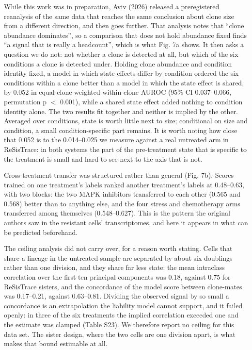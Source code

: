\documentclass[11pt,a4paper]{article}
\begin{document}
While this work was in preparation, Aviv (2026) released a preregistered reanalysis of the same data that reaches the same conclusion about clone size from a different direction, and then goes further. That analysis notes that ``clone abundance dominates'', so a comparison that does not hold abundance fixed finds ``a signal that is really a headcount'', which is what Fig. 7a shows. It then asks a question we do not: not whether a clone is detected at all, but which of the six conditions a clone is detected under. Holding clone abundance and condition identity fixed, a model in which state effects differ by condition ordered the six conditions within a clone better than a model in which the state effect is shared, by 0.052 in equal-clone-weighted within-clone AUROC (95\% CI 0.037--0.066, permutation p $<$ 0.001), while a shared state effect added nothing to condition identity alone. The two results fit together and neither is implied by the other. Averaged over conditions, state is worth little next to size; conditional on size and condition, a small condition-specific part remains. It is worth noting how close that 0.052 is to the 0.014--0.025 we measure against a real untreated arm in ReSisTrace: in both systems the part of the pre-treatment state that is specific to the treatment is small and hard to see next to the axis that is not.

Cross-treatment transfer was structured rather than general (Fig. 7b). Scores trained on one treatment's labels ranked another treatment's labels at 0.48--0.63, with two blocks: the two MAPK inhibitors transferred to each other (0.565 and 0.568) better than to anything else, and the four stress and chemotherapy arms transferred among themselves (0.548--0.627). This is the pattern the original authors saw in the resistant cells' transcriptomes, and here it appears in what can be predicted beforehand.

The ceiling analysis did not carry over, for a reason worth stating. Cells that share a lineage in the untreated sample are separated by about six doublings rather than one division, and they share far less state: the mean intraclass correlation over the first ten principal components was 0.18, against 0.75 for ReSisTrace sisters, and the concordance of the model score between clone-mates was 0.17--0.21, against 0.63--0.81. Dividing the observed signal by so small a concordance is an extrapolation the liability model cannot support, and it failed openly: in three of the six treatments the implied correlation exceeded one and the estimate was clamped (Table S23). We therefore report no ceiling for this data set. The sister design, where the two cells are one division apart, is what makes that bound estimable at all.
\end{document}
